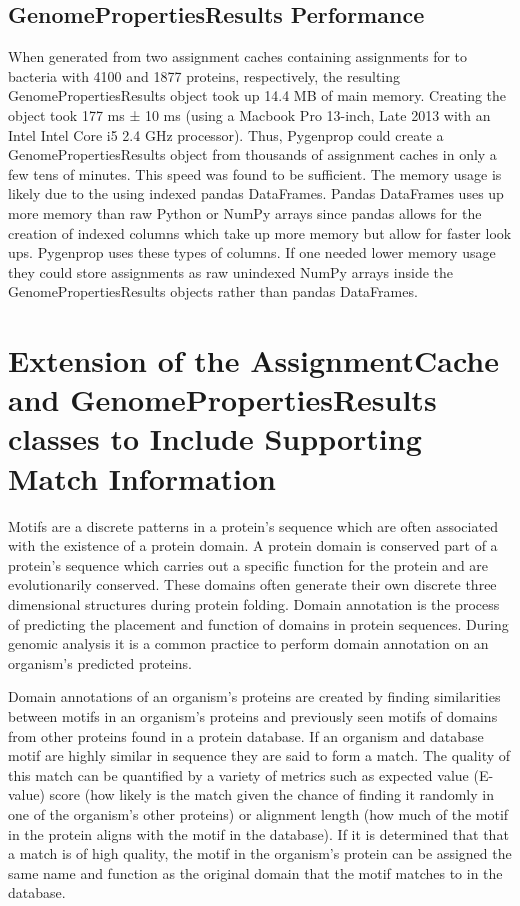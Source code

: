 \subsection{GenomePropertiesResults Performance}

When generated from two assignment caches containing assignments for to bacteria with 4100 and 1877 proteins, respectively, the resulting GenomePropertiesResults object took up 14.4 MB of main memory. Creating the  object took 177 ms ± 10 ms (using a Macbook Pro 13-inch, Late 2013 with an Intel Intel Core i5 2.4 GHz processor). Thus, Pygenprop could create a GenomePropertiesResults object from thousands of assignment caches in only a few tens of minutes. This speed was found to be sufficient. The memory usage is likely due to the using indexed pandas DataFrames. Pandas DataFrames uses up more memory than raw Python or NumPy arrays since pandas allows for the creation of indexed columns which take up more memory but allow for faster look ups. Pygenprop uses these types of columns. If one needed lower memory usage they could store assignments as raw unindexed NumPy arrays inside the GenomePropertiesResults objects rather than pandas DataFrames.

\section{Extension of the AssignmentCache and GenomePropertiesResults classes to Include Supporting Match Information}

Motifs are a discrete patterns in a protein's sequence which are often associated with the existence of a protein domain. A protein domain is conserved part of a protein's sequence which carries out a specific function for the protein and are evolutionarily conserved. These domains often generate their own discrete three dimensional structures during protein folding. Domain annotation is the process of predicting the placement and function of domains in protein sequences. During genomic analysis it is a common practice to perform domain annotation on an organism's predicted proteins.

Domain annotations of an organism's proteins are created by finding similarities between motifs in an organism's proteins and previously seen motifs of domains from other proteins found in a protein database. If an organism and database motif are highly similar in sequence they are said to form a match. The quality of this match can be quantified by a variety of metrics such as expected value (E-value) score (how likely is the match given the chance of finding it randomly in one of the organism's other proteins) or alignment length (how much of the motif in the protein aligns with the motif in the database). If it is determined that that a match is of high quality, the motif in the organism's protein can be assigned the same name and function as the original domain that the motif matches to in the database.

